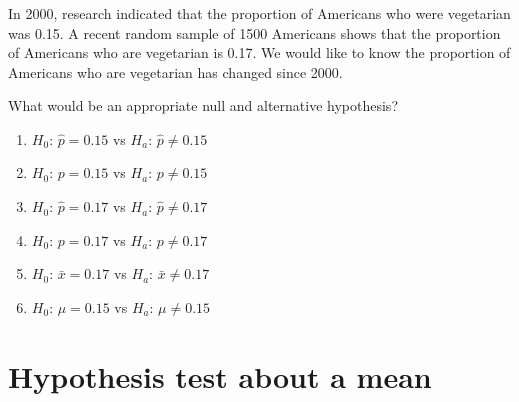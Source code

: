 \begin{frame}
\frametitle{\grp}
In 2000, research indicated that the proportion of Americans who were vegetarian was 0.15.  A recent random sample of 1500 Americans shows that the proportion of Americans who are vegetarian is 0.17.  We would like to know the proportion of Americans who are vegetarian has changed since 2000.
\begin{clicker}{What would be an appropriate null and alternative hypothesis?}
\begin{enumerate}
    \item
    $H_0$: $\hat{p}=0.15$ vs $H_a$: $\hat{p} \neq 0.15$
    \item
    $H_0$: $p=0.15$ vs $H_a$: $p \neq 0.15$
    \item
    $H_0$: $\hat{p}=0.17$ vs $H_a$: $\hat{p} \neq 0.17$
    \item
    $H_0$: $p=0.17$ vs $H_a$: $p \neq 0.17$
    \item
    $H_0$: $\bar{x}=0.17$ vs $H_a$: $\bar{x} \neq 0.17$
    \item
    $H_0$: $\mu=0.15$ vs $H_a$: $\mu \neq 0.15$
\end{enumerate}
\end{clicker}
\end{frame}




\section[Hypothesis test about a mean]{Hypothesis test about a mean}
\begin{frame}
\end{frame}


